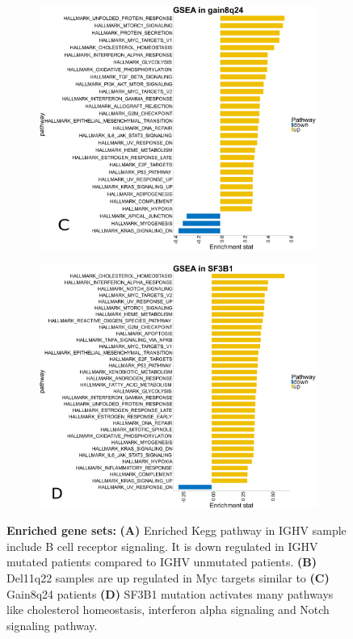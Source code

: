 \begin{figure}
\begin{subfigure}[t]{0.33\columnwidth}
		\subcaption*{}
		\label{fig:gsea_del11q22.3}
	\end{subfigure}
	\quad
	\begin{subfigure}[t]{0.47\columnwidth}
		\includegraphics[width=\columnwidth]{./Figures/gseaHallmark_gain8q24.pdf}
		\subcaption*{}
		\label{fig:gsea_gain8q24}
	\end{subfigure}
	\quad
	\begin{subfigure}[t]{0.47\columnwidth}
		\includegraphics[width=\columnwidth]{./Figures/gseaHallmark_SF3B1.pdf}
		\subcaption*{}
		\label{fig:gsea_SF3B1}
	\end{subfigure}
	\caption{\textbf{Enriched gene sets:} \textbf{(A)} Enriched Kegg pathway in IGHV sample include B cell receptor signaling. It is down regulated in IGHV mutated patients compared to IGHV unmutated patients. \textbf{(B)} Del11q22 samples are up regulated in Myc targets similar to \textbf{(C)} Gain8q24 patients \textbf{(D)} SF3B1 mutation activates many pathways like cholesterol homeostasis, interferon alpha signaling and Notch signaling pathway.}
	\label{fig:Enrichment_others}
	
\end{figure}


\FloatBarrier